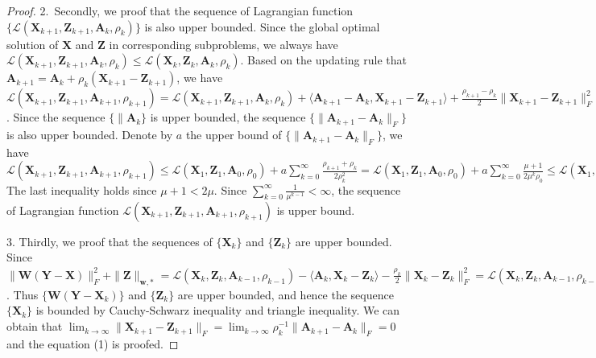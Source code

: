 \documentclass[10pt,twocolumn,letterpaper]{article}
\begin{document}
\begin{proof}
2.\ Secondly, we proof that the sequence of Lagrangian function $\{\mathcal{L}(\mathbf{X}_{k+1},\mathbf{Z}_{k+1},\mathbf{A}_{k},\rho_{k})\}$ is also upper bounded. Since the global optimal solution of $\mathbf{X}$ and $\mathbf{Z}$ in corresponding subproblems, we always have 
$
\mathcal{L}(\mathbf{X}_{k+1},\mathbf{Z}_{k+1},\mathbf{A}_{k},\rho_{k})
\le
\mathcal{L}(\mathbf{X}_{k},\mathbf{Z}_{k},\mathbf{A}_{k},\rho_{k}).
$
Based on the updating rule that 
$
\mathbf{A}_{k+1}
=
\mathbf{A}_{k} + \rho_{k}(\mathbf{X}_{k+1}-\mathbf{Z}_{k+1})
$,
we have 
$
\mathcal{L}(\mathbf{X}_{k+1},\mathbf{Z}_{k+1},\mathbf{A}_{k+1},\rho_{k+1})
=
\mathcal{L}(\mathbf{X}_{k+1},\mathbf{Z}_{k+1},\mathbf{A}_{k},\rho_{k})
+
\langle
\mathbf{A}_{k+1}
-
\mathbf{A}_{k}
,
\mathbf{X}_{k+1}
-
\mathbf{Z}_{k+1}
\rangle
+
\frac{\rho_{k+1}-\rho_{k}}{2}
\|
\mathbf{X}_{k+1}-\mathbf{Z}_{k+1}
\|_{F}^{2}
=
\mathcal{L}(\mathbf{X}_{k+1},\mathbf{Z}_{k+1},\mathbf{A}_{k},\rho_{k})
+
\frac{\rho_{k+1}+\rho_{k}}{2\rho_{k}^{2}}
\|
\mathbf{A}_{k+1}
-
\mathbf{A}_{k}
\|_{F}^{2}
$.
Since the sequence 
$\{\|
\mathbf{A}_{k}\}$
is upper bounded, the sequence 
$\{\|
\mathbf{A}_{k+1}
-
\mathbf{A}_{k}
\|_{F}\}$ is also upper bounded. Denote by $a$ the upper bound of 
$\{\|
\mathbf{A}_{k+1}
-
\mathbf{A}_{k}
\|_{F}\}$, 
we have 
$
\mathcal{L}(\mathbf{X}_{k+1},\mathbf{Z}_{k+1},\mathbf{A}_{k+1},\rho_{k+1})
\le
\mathcal{L}(\mathbf{X}_{1},\mathbf{Z}_{1},\mathbf{A}_{0},\rho_{0})
+
a\sum_{k=0}^{\infty}\frac{\rho_{k+1}+\rho_{k}}{2\rho_{k}^{2}}
=
\mathcal{L}(\mathbf{X}_{1},\mathbf{Z}_{1},\mathbf{A}_{0},\rho_{0})
+
a\sum_{k=0}^{\infty}\frac{\mu+1}{2\mu^{k}\rho_{0}}
\le
\mathcal{L}(\mathbf{X}_{1},\mathbf{Z}_{1},\mathbf{A}_{0},\rho_{0})
+
\frac{a}{\rho_{0}}\sum_{k=0}^{\infty}\frac{1}{\mu^{k-1}}.
$
The last inequality holds since $\mu+1<2\mu$. Since $\sum_{k=0}^{\infty}\frac{1}{\mu^{k-1}}<\infty$, the sequence of Lagrangian function 
$\mathcal{L}(\mathbf{X}_{k+1},\mathbf{Z}_{k+1},\mathbf{A}_{k+1},\rho_{k+1})$
is upper bound.

3. Thirdly, we proof that the sequences of 
$\{\mathbf{X}_{k}\}$ and $\{\mathbf{Z}_{k}\}$ are upper bounded. Since 
$\|\mathbf{W}(\mathbf{Y}-\mathbf{X})\|_{F}^{2}
+
\|\mathbf{Z}\|_{\bm{w},*}
=
\mathcal{L}(\mathbf{X}_{k},\mathbf{Z}_{k},\mathbf{A}_{k-1},\rho_{k-1})
-
\langle
\mathbf{A}_{k},
\mathbf{X}_{k}-\mathbf{Z}_{k}
\rangle
-
\frac{\rho_{k}}{2}
\|
\mathbf{X}_{k}-\mathbf{Z}_{k}
\|_{F}^{2}
=
\mathcal{L}(\mathbf{X}_{k},\mathbf{Z}_{k},\mathbf{A}_{k-1},\rho_{k-1})
+
\frac{1}{2\rho_{k}}
(
\|
\mathbf{A}_{k-1}
\|_{F}^{2}
-
\|
\mathbf{A}_{k}
\|_{F}^{2}
)
$.
Thus $\{\mathbf{W}(\mathbf{Y}-\mathbf{X}_{k})\}$ and $\{\mathbf{Z}_{k}\}$ are upper bounded, and hence
the sequence $\{\mathbf{X}_{k}\}$ is bounded by Cauchy-Schwarz inequality and triangle inequality.
We can obtain that 
$
\lim_{k \to \infty} 
\|\mathbf{X}_{k+1}-\mathbf{Z}_{k+1}\|_{F}
=
\lim_{k \to \infty} 
\rho_{k}^{-1}
\|
\mathbf{A}_{k+1}
-
\mathbf{A}_{k}
\|_{F}
=
0
$ and the equation (1) is proofed.


\end{proof}
\end{document}
